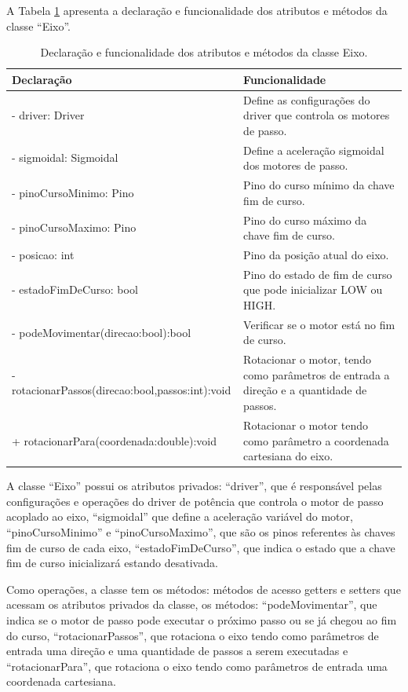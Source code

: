 A Tabela \ref{tab:classeeixo} apresenta a declaração e funcionalidade dos atributos e métodos da 
classe “Eixo”.

\begin{table}[H]
    \footnotesize
    \centering
    \caption{Declaração e funcionalidade dos atributos e métodos da classe Eixo.}
    \begin{tabular}{lp{6cm}}
        \hline
        \textbf{Declaração} & \textbf{Funcionalidade}\\
        \hline
        - driver: Driver & Define as configurações do driver que controla os motores de passo.\\
        - sigmoidal: Sigmoidal & Define a aceleração sigmoidal dos motores de passo.\\
        - pinoCursoMinimo: Pino & Pino do curso mínimo da chave fim de curso.\\
        - pinoCursoMaximo: Pino & Pino do curso máximo da chave fim de curso.\\
        - posicao: int & Pino da posição atual do eixo.\\
        - estadoFimDeCurso: bool & Pino do estado de fim de curso que pode inicializar LOW ou HIGH.\\
        - podeMovimentar(direcao:bool):bool & Verificar se o motor está no fim de curso.\\
        - rotacionarPassos(direcao:bool,passos:int):void & Rotacionar o motor, tendo como parâmetros de entrada a direção e a quantidade de passos.\\
        + rotacionarPara(coordenada:double):void & Rotacionar o motor tendo como parâmetro a coordenada cartesiana do eixo.\\
        \hline       
    \end{tabular}
    \label{tab:classeeixo}
\end{table}

A classe “Eixo” possui os atributos privados: “driver”, que é responsável pelas configurações e operações 
do driver de potência que controla o motor de passo acoplado ao eixo, “sigmoidal” que define a aceleração 
variável do motor, “pinoCursoMinimo” e “pinoCursoMaximo”, que são os pinos referentes às chaves fim de 
curso de cada eixo, “estadoFimDeCurso”, que indica o estado que a chave fim de curso inicializará estando 
desativada. 

Como operações, a classe tem os métodos: métodos de acesso getters e setters que acessam os atributos 
privados da classe, os métodos: “podeMovimentar”, que indica se o motor de passo pode executar o próximo 
passo ou se já chegou ao fim do curso, “rotacionarPassos”, que rotaciona o eixo tendo como parâmetros de 
entrada uma direção e uma quantidade de passos a serem executadas e “rotacionarPara”, que rotaciona o 
eixo tendo como parâmetros de entrada uma coordenada cartesiana.

